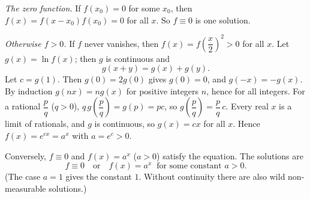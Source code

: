 \emph{The zero function.} If $f(x_0)=0$ for some $x_0$, then $f(x)=f(x-x_0)f(x_0)=0$ for all $x$. So $f\equiv0$ is one solution.

\emph{Otherwise $f>0$.} If $f$ never vanishes, then $f(x)=f\left(\dfrac {x}{2}\right)^2>0$ for all $x$. Let $g(x)=\ln f(x)$; then $g$ is continuous and
\[
g(x+y)=g(x)+g(y).
\]
Let $c=g(1)$. Then $g(0)=2g(0)$ gives $g(0)=0$, and $g(-x)=-g(x)$. By induction $g(nx)=ng(x)$ for positive integers $n$, hence for all integers. For a rational $\dfrac {p}{q}$ ($q>0$), $q\,g\left(\dfrac {p}{q}\right)=g(p)=pc$, so $g\left(\dfrac {p}{q}\right)=\dfrac {p}{q}\,c$. Every real $x$ is a limit of rationals, and $g$ is continuous, so $g(x)=cx$ for all $x$. Hence $f(x)=e^{cx}=a^x$ with $a=e^c>0$.

Conversely, $f\equiv0$ and $f(x)=a^x$ ($a>0$) satisfy the equation. The solutions are
\[
\boxed{f\equiv0\quad\text{or}\quad f(x)=a^x\ \text{ for some constant }a>0}.
\]
(The case $a=1$ gives the constant $1$. Without continuity there are also wild non-measurable solutions.)
